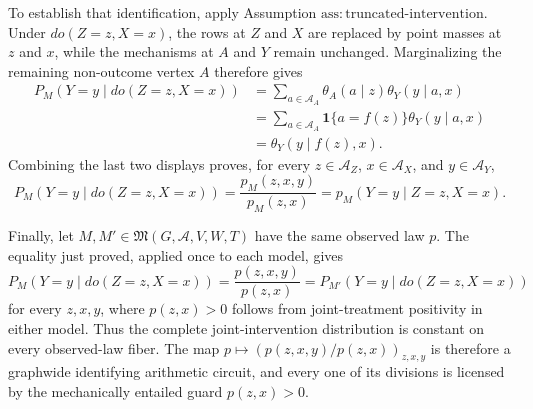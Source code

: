 To establish that identification, apply Assumption \(\mathrm{ass:truncated\text{-}intervention}\).  Under \(do(Z=z,X=x)\), the rows at \(Z\) and \(X\) are replaced by point masses at \(z\) and \(x\), while the mechanisms at \(A\) and \(Y\) remain unchanged.  Marginalizing the remaining non-outcome vertex \(A\) therefore gives
\[
\begin{aligned}
 P_M(Y=y\mid do(Z=z,X=x))
 &=\sum_{a\in\mathcal A_A}\theta_A(a\mid z)\theta_Y(y\mid a,x)\\
 &=\sum_{a\in\mathcal A_A}\mathbf 1\{a=f(z)\}\theta_Y(y\mid a,x)\\
 &=\theta_Y(y\mid f(z),x).
\end{aligned}
\]
Combining the last two displays proves, for every \(z\in\mathcal A_Z\), \(x\in\mathcal A_X\), and \(y\in\mathcal A_Y\),
\[
 P_M(Y=y\mid do(Z=z,X=x))
 =\frac{p_M(z,x,y)}{p_M(z,x)}
 =p_M(Y=y\mid Z=z,X=x).
\]

Finally, let \(M,M'\in\mathfrak M(G,\mathcal A,V,W,T)\) have the same observed law \(p\).  The equality just proved, applied once to each model, gives
\[
 P_M(Y=y\mid do(Z=z,X=x))
 =\frac{p(z,x,y)}{p(z,x)}
 =P_{M'}(Y=y\mid do(Z=z,X=x))
\]
for every \(z,x,y\), where \(p(z,x)>0\) follows from joint-treatment positivity in either model.  Thus the complete joint-intervention distribution is constant on every observed-law fiber.  The map \(p\mapsto(p(z,x,y)/p(z,x))_{z,x,y}\) is therefore a graphwide identifying arithmetic circuit, and every one of its divisions is licensed by the mechanically entailed guard \(p(z,x)>0\).